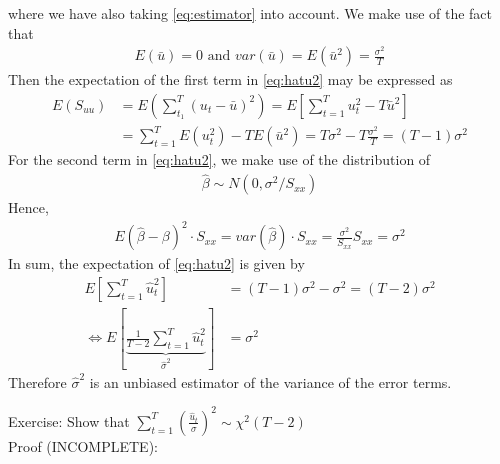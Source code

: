 \documentclass{article}
\begin{document}
where we have also taking \eqref{eq:estimator} into account. We make use of the fact that 
\begin{align}
E(\bar{u})=0 \text{ and } var(\bar{u})=E(\bar{u}^2)=\frac{\sigma^2}{T}
\end{align} 
Then the expectation of the first term in \eqref{eq:hatu2} may be expressed as
\begin{align}
E(S_{uu}) &= E\left(\sum_{t_1}^{T}(u_t-\bar{u})^2\right) = E\left[\sum_{t=1}^{T}u_t^2 - T\bar{u}^2 \right] \\
&= \sum_{t=1}^{T} E(u_t^2) - T E(\bar{u}^2)  = T \sigma^2 - T \frac{\sigma^2}{T} = (T-1)\sigma^2
\end{align}
For the second term in \eqref{eq:hatu2}, we make use of the distribution of 
\begin{align}
	\hat{\beta} \sim N(0,\sigma^2/S_{xx})\label{eq:distributionbeta}
\end{align}
Hence,
\begin{align}
	E(\hat{\beta}-\beta)^2 \cdot S_{xx} = var(\hat{\beta})\cdot S_{xx} = \frac{\sigma^2}{S_{xx}}S_{xx} = \sigma^2
\end{align}
In sum, the expectation of \eqref{eq:hatu2} is given by
\begin{align}
	E\left[\sum_{t=1}^{T}\hat{u}_t^2\right] &= (T-1)\sigma^2 - \sigma^2 = (T-2)\sigma^2\\
	\Leftrightarrow E\left[\underbrace{\frac{1}{T-2}\sum_{t=1}^{T}\hat{u}_t^2}_{\hat{\sigma}^2}\right] &= \sigma^2
\end{align}
Therefore $\hat{\sigma}^2$ is an unbiased estimator of the variance of the error terms.

\newpage
Exercise: Show that $\sum_{t=1}^T \left(\frac{\hat{u}_t}{\sigma}\right)^2 \sim \chi^2(T-2)$\\

Proof (INCOMPLETE): 
\end{document}

